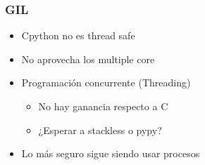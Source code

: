 \documentclass{beamer}
\begin{document}
\begin{frame}
 \frametitle{GIL}
\begin{itemize}
 \item Cpython no es thread safe
 \item No aprovecha los multiple core
 \item Programación concurrente (Threading)
 \begin{itemize}
 \item No hay ganancia respecto a C
 \item ¿Esperar a stackless o pypy?
\end{itemize}
 \item Lo más seguro sigue siendo usar procesos
\end{itemize}
\end{frame}
\end{document}

